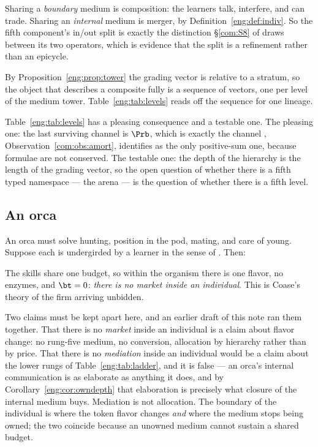 \begin{corollary}\label{eng:composition-merger-two-halves}
Sharing a \emph{boundary} medium is composition: the learners talk,
interfere, and can trade. Sharing an \emph{internal} medium is merger, by
Definition~\ref{eng:def:indiv}. So the fifth component's in/out split is
exactly the distinction \S\ref{com:S8} of \chComp draws between its two
operators, which is evidence that the split is a refinement rather than an
epicycle.
\end{corollary}

\begin{corollary}\label{eng:k-sequence}
By Proposition~\ref{eng:prop:tower} the grading vector is relative to a
stratum, so the object that describes a composite fully is a sequence of
vectors, one per level of the medium tower. Table~\ref{eng:tab:levels} reads
off the sequence for one lineage.
\end{corollary}

Table~\ref{eng:tab:levels} has a pleasing consequence and a testable one. The
pleasing one: the last surviving channel is $\Prb$, which is exactly the
channel \chComp, Observation~\ref{com:obs:amort}, identifies as the only positive-sum one,
because formulae are not conserved. The testable one: the depth of the
hierarchy is the length of the grading vector, so the open question of
whether there is a fifth typed namespace --- the arena --- is the question
of whether there is a fifth level.

\subsection{An orca}\label{eng:S9.4}

An orca must solve hunting, position in the pod, mating, and care of young.
Suppose each is undergirded by a learner in the sense of \chComp.
Then:

The skills share one budget, so within the organism there is one flavor, no
enzymes, and $\bt = 0$: \emph{there is no market inside an individual}. This
is Coase's theory of the firm \cite{coase} arriving unbidden.

Two claims must be kept apart here, and an earlier draft of this note ran
them together. That there is no \emph{market} inside an individual is a
claim about flavor change: no rung-five medium, no conversion, allocation
by hierarchy rather than by price. That there is no \emph{mediation} inside
an individual would be a claim about the lower rungs of
Table~\ref{eng:tab:ladder}, and it is false --- an orca's internal
communication is as elaborate as anything it does, and by
Corollary~\ref{eng:cor:owndepth} that elaboration is precisely what closure of
the internal medium buys. Mediation is not allocation. The boundary of the
individual is where the token flavor changes \emph{and} where the medium
stops being owned; the two coincide because an unowned medium cannot
sustain a shared budget.

